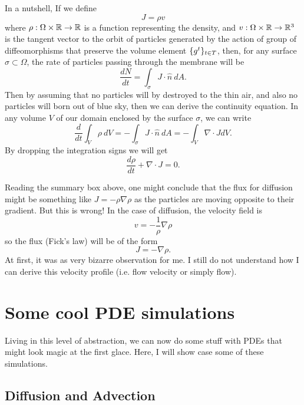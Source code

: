 \begin{summary}
	\label{summary:groupActionOfDiffeomorphisms}
	In a nutshell, If we define 
	\[  J = \rho v \]
	where $ \rho :\Omega \times \mathbb{R} \to \mathbb{R} $ is a function representing the density, and $ v: \Omega \times \mathbb{R} \to \mathbb{R}^3 $ is the tangent vector to the orbit of particles generated by the action of group of diffeomorphisms that preserve the volume element $ \{g^t\}_{t\in T} $, then, for any surface $ \sigma \subset \Omega $, the rate of particles passing through the membrane will be
	\[ \frac{dN}{dt} = \int_\sigma J\cdot \hat{n}\ dA. \]
	Then by assuming that no particles will by destroyed to the thin air, and also no particles will born out of blue sky, then we can derive the continuity equation. In any volume $ V $ of our domain enclosed by the surface $ \sigma $, we can write
	\[ \frac{d}{dt} \int_V \rho\ dV = - \int_\sigma J\cdot \hat{n}\ dA = - \int_V \nabla\cdot J dV. \]
	By dropping the integration signs we will get
	\[ \frac{d\rho}{dt} + \nabla\cdot J = 0.  \]
\end{summary}


\begin{observation}
	Reading the summary box above, one might conclude that the flux for diffusion might be something like $ J = - \rho \nabla\rho $ as the particles are moving opposite to their gradient. But this is wrong! In the case of diffusion, the velocity field is
	\[ v = -\frac{1}{\rho} \nabla \rho \]
	so the flux (Fick's law) will be of the form
	\[  J =  -\nabla\rho. \]
	At first, it was as very bizarre observation for me. I still do not understand how I can derive this velocity profile (i.e. flow velocity or simply flow).
\end{observation}

\section{Some cool PDE simulations}
Living in this level of abstraction, we can now do some stuff with PDEs that might look magic at the first glace. Here, I will show case some of these simulations. 

\subsection{Diffusion and Advection}

